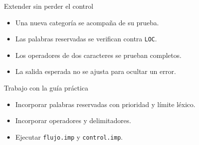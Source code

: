 \documentclass[11pt,spanish]{beamer}
\newcommand{\actividad}[1]{\textbf{\textcolor{Rojo}{#1}}}
\begin{document}
\begin{frame}{Extender sin perder el control}
\vfill

\begin{center}
\end{center}

\bigskip

\begin{itemize}
  \item Una nueva categoría se acompaña de su prueba.
  \item Las palabras reservadas se verifican contra \texttt{LOC}.
  \item Los operadores de dos caracteres se prueban completos.
  \item La salida esperada no se ajusta para ocultar un error.
\end{itemize}

\vfill
\end{frame}

\begin{frame}{Trabajo con la guía práctica}
\vfill
\begin{center}
\end{center}
\bigskip
\begin{itemize}
  \item Incorporar palabras reservadas con prioridad y límite léxico.
  \item Incorporar operadores y delimitadores.
  \item Ejecutar \texttt{flujo.imp} y \texttt{control.imp}.
\end{itemize}
\vfill
\end{frame}
\end{document}

